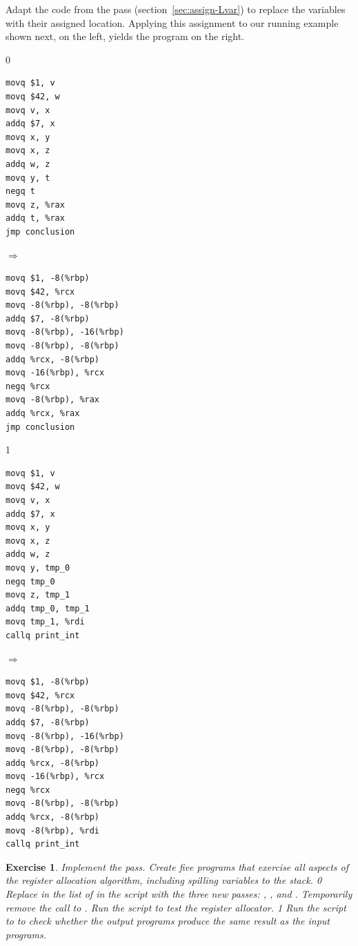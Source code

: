 \documentclass[7x10]{TimesAPriori_MIT}%
\def\racketEd{0}
\def\pythonEd{1}
\def\edition{1}
\newcommand{\pythonColor}[0]{}
\newtheorem{exercise}[theorem]{Exercise}
\numberwithin{theorem}{chapter}
\numberwithin{definition}{chapter}
\numberwithin{equation}{chapter}
\begin{document}
Adapt the code from the  pass
(section~\ref{sec:assign-Lvar}) to replace the variables with their
assigned location. Applying this assignment to our running
example shown next, on the left, yields the program on the right.
\begin{center}
{\if\edition\racketEd      
\begin{minipage}{0.35\textwidth}
\begin{lstlisting}
movq $1, v
movq $42, w
movq v, x
addq $7, x
movq x, y
movq x, z
addq w, z
movq y, t
negq t
movq z, %rax
addq t, %rax
jmp conclusion
\end{lstlisting}
\end{minipage}
$\Rightarrow\qquad$
\begin{minipage}{0.45\textwidth}
\begin{lstlisting}
movq $1, -8(%rbp)
movq $42, %rcx
movq -8(%rbp), -8(%rbp)
addq $7, -8(%rbp)
movq -8(%rbp), -16(%rbp)
movq -8(%rbp), -8(%rbp)
addq %rcx, -8(%rbp)
movq -16(%rbp), %rcx
negq %rcx
movq -8(%rbp), %rax
addq %rcx, %rax
jmp conclusion
\end{lstlisting}
\end{minipage}
\fi}
{\if\edition\pythonEd\pythonColor
\begin{minipage}{0.35\textwidth}
\begin{lstlisting}
movq $1, v
movq $42, w
movq v, x
addq $7, x
movq x, y
movq x, z
addq w, z
movq y, tmp_0
negq tmp_0
movq z, tmp_1
addq tmp_0, tmp_1
movq tmp_1, %rdi
callq print_int
\end{lstlisting}
\end{minipage}
$\Rightarrow\qquad$
\begin{minipage}{0.45\textwidth}
\begin{lstlisting}
movq $1, -8(%rbp)
movq $42, %rcx
movq -8(%rbp), -8(%rbp)
addq $7, -8(%rbp)
movq -8(%rbp), -16(%rbp)
movq -8(%rbp), -8(%rbp)
addq %rcx, -8(%rbp)
movq -16(%rbp), %rcx
negq %rcx
movq -8(%rbp), -8(%rbp)
addq %rcx, -8(%rbp)
movq -8(%rbp), %rdi
callq print_int    
\end{lstlisting}
\end{minipage}
\fi}
\end{center}

\begin{exercise}\normalfont\normalsize
Implement the  pass.
Create five programs that exercise all aspects of the register
allocation algorithm, including spilling variables to the stack.
%
{\if\edition\racketEd      
Replace  in the list of  in the
 script with the three new passes:
, , and
.
Temporarily remove the call to .
Run the script to test the register allocator.
\fi}
%
{\if\edition\pythonEd\pythonColor      
Run the  script to to check whether the
output programs produce the same result as the input programs.
\fi}
\end{exercise}
\end{document}
